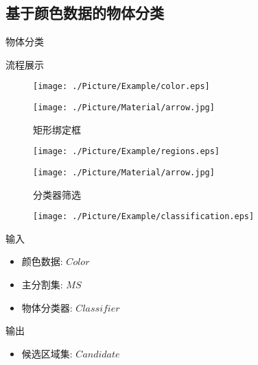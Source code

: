 \documentclass[xcolor=table,compress,blue]{beamer}
\begin{document}
  \subsection{基于颜色数据的物体分类}
	\begin{frame}{物体分类}
		\begin{exampleblock}{流程展示}
			\begin{figure}[htpb]
				\centering
				\begin{minipage}[b]{0.8in}
					\centerline{ \texttt{[image: ./Picture/Example/color.eps]} }
				\end{minipage}
				\begin{minipage}[b]{0.8in}
					\centerline{ \texttt{[image: ./Picture/Material/arrow.jpg]} }
					\centerline{\tiny{矩形绑定框}}
				\end{minipage}
				\begin{minipage}[b]{0.8in}
					\centerline{ \texttt{[image: ./Picture/Example/regions.eps]} }
				\end{minipage}
				\begin{minipage}[b]{0.8in}
					\centerline{ \texttt{[image: ./Picture/Material/arrow.jpg]} }
					\centerline{\tiny{分类器筛选}}
				\end{minipage}
				\begin{minipage}[b]{0.8in}
					\centerline{ \texttt{[image: ./Picture/Example/classification.eps]} }
				\end{minipage}
			\end{figure}
		\end{exampleblock}
		\begin{exampleblock}{输入}
			\begin{itemize}		
				\item 颜色数据: $Color$	
				\item 主分割集: $MS$ 
				\item 物体分类器: ${Classifier}$
			\end{itemize}
		\end{exampleblock}
		\begin{exampleblock}{输出}
			\begin{itemize}
				\item 候选区域集: $Candidate$
			\end{itemize}
		\end{exampleblock}
	\end{frame}
	
\end{document}
